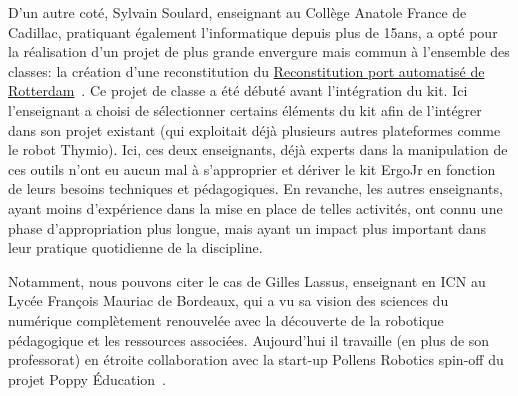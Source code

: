             D'un autre coté, Sylvain Soulard, enseignant au Collège Anatole France de Cadillac, pratiquant également l'informatique depuis plus de 15ans, a opté pour la réalisation d'un projet de plus grande envergure mais commun à l'ensemble des classes: la création d'une reconstitution du \href{https://forum.poppy-project.org/t/activite-ergo-jr-range-des-conteneurs/2505/3}{Reconstitution port automatisé de Rotterdam}~. Ce projet de classe a été débuté avant l'intégration du kit. Ici l'enseignant a choisi de sélectionner certains éléments du kit afin de l'intégrer dans son projet existant (qui exploitait déjà plusieurs autres plateformes comme le robot Thymio).
            Ici, ces deux enseignants, déjà experts dans la manipulation de ces outils n'ont eu aucun mal à s'approprier et dériver le kit ErgoJr en fonction de leurs besoins techniques et pédagogiques. En revanche, les autres enseignants, ayant moins d'expérience dans la mise en place de telles activités, ont connu une phase d'appropriation plus longue, mais ayant un impact plus important dans leur pratique quotidienne de la discipline.\par%
        \label{sec:prof-GL}
            Notamment, nous pouvons citer le cas de Gilles Lassus, enseignant en ICN au Lycée François Mauriac de Bordeaux, qui a vu sa vision des sciences du numérique complètement renouvelée avec la découverte de la robotique pédagogique et les ressources associées. Aujourd'hui il travaille (en plus de son professorat) en étroite collaboration avec la start-up Pollens Robotics spin-off du projet Poppy Éducation~.\par%
